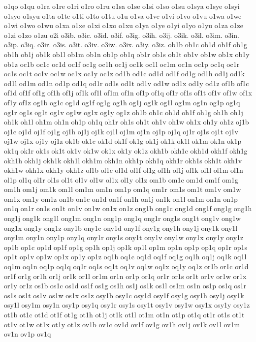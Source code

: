 {o1qo
o1qu
o1ra
o1re
o1ri
o1ro
o1ru
o1sa
o1se
o1si
o1so
o1su
o1sya
o1sye
o1syi
o1syo
o1syu
o1ta
o1te
o1ti
o1to
o1tu
o1u
o1va
o1ve
o1vi
o1vo
o1vu
o1wa
o1we
o1wi
o1wo
o1wu
o1xa
o1xe
o1xi
o1xo
o1xu
o1ya
o1ye
o1yi
o1yo
o1yu
o1za
o1ze
o1zi
o1zo
o1zu
o2i
o3ib.
o3ic.
o3id.
o3if.
o3ig.
o3ih.
o3ij.
o3ik.
o3il.
o3im.
o3in.
o3ip.
o3iq.
o3ir.
o3is.
o3it.
o3iv.
o3iw.
o3ix.
o3iy.
o3iz.
ob1b
ob1c
ob1d
ob1f
ob1g
ob1h
ob1j
ob1k
ob1l
ob1m
ob1n
ob1p
ob1q
ob1r
ob1s
ob1t
ob1v
ob1w
ob1x
ob1y
ob1z
oc1b
oc1c
oc1d
oc1f
oc1g
oc1h
oc1j
oc1k
oc1l
oc1m
oc1n
oc1p
oc1q
oc1r
oc1s
oc1t
oc1v
oc1w
oc1x
oc1y
oc1z
od1b
od1c
od1d
od1f
od1g
od1h
od1j
od1k
od1l
od1m
od1n
od1p
od1q
od1r
od1s
od1t
od1v
od1w
od1x
od1y
od1z
of1b
of1c
of1d
of1f
of1g
of1h
of1j
of1k
of1l
of1m
of1n
of1p
of1q
of1r
of1s
of1t
of1v
of1w
of1x
of1y
of1z
og1b
og1c
og1d
og1f
og1g
og1h
og1j
og1k
og1l
og1m
og1n
og1p
og1q
og1r
og1s
og1t
og1v
og1w
og1x
og1y
og1z
oh1b
oh1c
oh1d
oh1f
oh1g
oh1h
oh1j
oh1k
oh1l
oh1m
oh1n
oh1p
oh1q
oh1r
oh1s
oh1t
oh1v
oh1w
oh1x
oh1y
oh1z
oj1b
oj1c
oj1d
oj1f
oj1g
oj1h
oj1j
oj1k
oj1l
oj1m
oj1n
oj1p
oj1q
oj1r
oj1s
oj1t
oj1v
oj1w
oj1x
oj1y
oj1z
ok1b
ok1c
ok1d
ok1f
ok1g
ok1j
ok1k
ok1l
ok1m
ok1n
ok1p
ok1q
ok1r
ok1s
ok1t
ok1v
ok1w
ok1x
ok1y
ok1z
okh1b
okh1c
okh1d
okh1f
okh1g
okh1h
okh1j
okh1k
okh1l
okh1m
okh1n
okh1p
okh1q
okh1r
okh1s
okh1t
okh1v
okh1w
okh1x
okh1y
okh1z
ol1b
ol1c
ol1d
ol1f
ol1g
ol1h
ol1j
ol1k
ol1l
ol1m
ol1n
ol1p
ol1q
ol1r
ol1s
ol1t
ol1v
ol1w
ol1x
ol1y
ol1z
om1b
om1c
om1d
om1f
om1g
om1h
om1j
om1k
om1l
om1m
om1n
om1p
om1q
om1r
om1s
om1t
om1v
om1w
om1x
om1y
om1z
on1b
on1c
on1d
on1f
on1h
on1j
on1k
on1l
on1m
on1n
on1p
on1q
on1r
on1s
on1t
on1v
on1w
on1x
on1z
ong1b
ong1c
ong1d
ong1f
ong1g
ong1h
ong1j
ong1k
ong1l
ong1m
ong1n
ong1p
ong1q
ong1r
ong1s
ong1t
ong1v
ong1w
ong1x
ong1y
ong1z
ony1b
ony1c
ony1d
ony1f
ony1g
ony1h
ony1j
ony1k
ony1l
ony1m
ony1n
ony1p
ony1q
ony1r
ony1s
ony1t
ony1v
ony1w
ony1x
ony1y
ony1z
op1b
op1c
op1d
op1f
op1g
op1h
op1j
op1k
op1l
op1m
op1n
op1p
op1q
op1r
op1s
op1t
op1v
op1w
op1x
op1y
op1z
oq1b
oq1c
oq1d
oq1f
oq1g
oq1h
oq1j
oq1k
oq1l
oq1m
oq1n
oq1p
oq1q
oq1r
oq1s
oq1t
oq1v
oq1w
oq1x
oq1y
oq1z
or1b
or1c
or1d
or1f
or1g
or1h
or1j
or1k
or1l
or1m
or1n
or1p
or1q
or1r
or1s
or1t
or1v
or1w
or1x
or1y
or1z
os1b
os1c
os1d
os1f
os1g
os1h
os1j
os1k
os1l
os1m
os1n
os1p
os1q
os1r
os1s
os1t
os1v
os1w
os1x
os1z
osy1b
osy1c
osy1d
osy1f
osy1g
osy1h
osy1j
osy1k
osy1l
osy1m
osy1n
osy1p
osy1q
osy1r
osy1s
osy1t
osy1v
osy1w
osy1x
osy1y
osy1z
ot1b
ot1c
ot1d
ot1f
ot1g
ot1h
ot1j
ot1k
ot1l
ot1m
ot1n
ot1p
ot1q
ot1r
ot1s
ot1t
ot1v
ot1w
ot1x
ot1y
ot1z
ov1b
ov1c
ov1d
ov1f
ov1g
ov1h
ov1j
ov1k
ov1l
ov1m
ov1n
ov1p
ov1q
}
